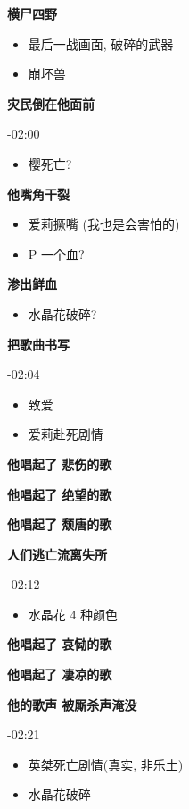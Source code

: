 \documentclass[a4paper]{article}
\begin{document}
\textbf{横尸四野}

\begin{itemize}
    \item 最后一战画面, 破碎的武器
    \item 崩坏兽
\end{itemize}

\textbf{灾民倒在他面前}

-02:00

\begin{itemize}
    \item 樱死亡?
\end{itemize}

\textbf{他嘴角干裂}

\begin{itemize}
    \item 爱莉撅嘴 (我也是会害怕的)
    \item P 一个血?
\end{itemize}

\textbf{渗出鲜血}

\begin{itemize}
    \item 水晶花破碎?
\end{itemize}

\textbf{把歌曲书写}

-02:04

\begin{itemize}
    \item 致爱
    \item 爱莉赴死剧情
\end{itemize}

\textbf{他唱起了 悲伤的歌}

\textbf{他唱起了 绝望的歌}

\textbf{他唱起了 颓唐的歌}

\textbf{人们逃亡流离失所}

-02:12

\begin{itemize}
    \item 水晶花 4 种颜色
\end{itemize}

\textbf{他唱起了 哀恸的歌}

\textbf{他唱起了 凄凉的歌}

\textbf{他的歌声 被厮杀声淹没}

-02:21

\begin{itemize}
    \item 英桀死亡剧情(真实, 非乐土)
    \item 水晶花破碎
\end{itemize}
\end{document}
